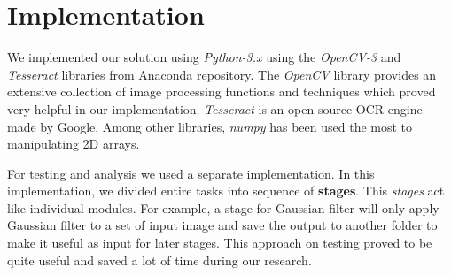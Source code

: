 \documentclass{standalone}
\begin{document}
\section{Implementation}
We implemented our solution using {\it Python-3.x} using the {\it OpenCV-3} and {\it Tesseract} libraries from Anaconda repository. The {\it OpenCV} library provides an extensive collection of image processing functions and techniques which proved very helpful in our implementation. 
{\it Tesseract} is an open source OCR engine made by Google. Among other libraries, {\it numpy} has been used the most to manipulating 2D arrays.

For testing and analysis we used a separate implementation. In this implementation, we divided entire tasks into sequence of {\bf stages}. This {\it stages} act like individual modules. For example, a stage for Gaussian filter will only apply Gaussian filter to a set of input image and save the output to another folder to make it useful as input for later stages. This approach on testing proved to be quite useful and saved a lot of time during our research.
\end{document}
